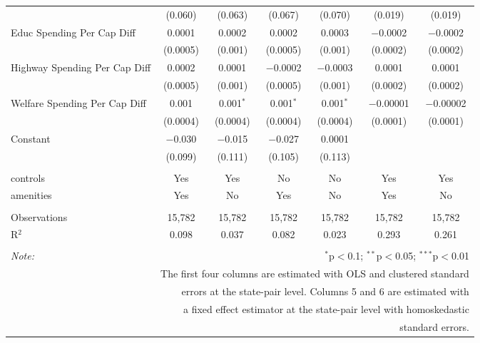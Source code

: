 \begin{table}[!htbp]
\begin{tabular}{@{\extracolsep{5pt}}lcccccc}
  & (0.060) & (0.063) & (0.067) & (0.070) & (0.019) & (0.019) \\ 
  Educ Spending Per Cap Diff & 0.0001 & 0.0002 & 0.0002 & 0.0003 & $-$0.0002 & $-$0.0002 \\ 
  & (0.0005) & (0.001) & (0.0005) & (0.001) & (0.0002) & (0.0002) \\ 
  Highway Spending Per Cap Diff & 0.0002 & 0.0001 & $-$0.0002 & $-$0.0003 & 0.0001 & 0.0001 \\ 
  & (0.0005) & (0.001) & (0.0005) & (0.001) & (0.0002) & (0.0002) \\ 
  Welfare Spending Per Cap Diff & 0.001 & 0.001$^{*}$ & 0.001$^{*}$ & 0.001$^{*}$ & $-$0.00001 & $-$0.00002 \\ 
  & (0.0004) & (0.0004) & (0.0004) & (0.0004) & (0.0001) & (0.0001) \\ 
  Constant & $-$0.030 & $-$0.015 & $-$0.027 & 0.0001 &  &  \\ 
  & (0.099) & (0.111) & (0.105) & (0.113) &  &  \\ 
 \hline \\[-1.8ex] 
controls & Yes & Yes & No & No & Yes & Yes \\ 
amenities & Yes & No & Yes & No & Yes & No \\ 
\hline \\[-1.8ex] 
Observations & 15,782 & 15,782 & 15,782 & 15,782 & 15,782 & 15,782 \\ 
R$^{2}$ & 0.098 & 0.037 & 0.082 & 0.023 & 0.293 & 0.261 \\ 
\hline 
\hline \\[-1.8ex] 
\textit{Note:}  & \multicolumn{6}{r}{$^{*}$p$<$0.1; $^{**}$p$<$0.05; $^{***}$p$<$0.01} \\ 
 & \multicolumn{6}{r}{The first four columns are estimated with OLS and clustered standard} \\ 
 & \multicolumn{6}{r}{ errors at the state-pair level. Columns 5 and 6 are estimated with} \\ 
 & \multicolumn{6}{r}{a fixed effect estimator at the state-pair level with homoskedastic} \\ 
 & \multicolumn{6}{r}{standard errors.} \\ 
\end{tabular} 
\end{table} 
